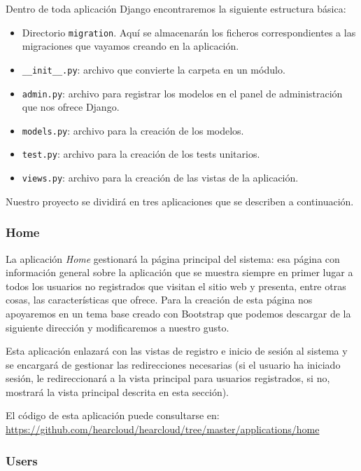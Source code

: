 Dentro de toda aplicación Django encontraremos la siguiente estructura básica:

\begin{itemize}
	\item Directorio \texttt{migration}. Aquí se almacenarán los ficheros correspondientes a las migraciones que vayamos creando en la aplicación.
	\item \texttt{\_\_init\_\_.py}: archivo que convierte la carpeta en un módulo.
	\item \texttt{admin.py}: archivo para registrar los modelos en el panel de administración que nos ofrece Django.
	\item \texttt{models.py}: archivo para la creación de los modelos.
	\item \texttt{test.py}: archivo para la creación de los tests unitarios.
	\item \texttt{views.py}: archivo para la creación de las vistas de la aplicación.
\end{itemize}

Nuestro proyecto se dividirá en tres aplicaciones que se describen a continuación.

\subsubsection{Home}

La aplicación \textit{Home} gestionará la página principal del sistema: esa página con información general sobre la aplicación que se muestra siempre en primer lugar a todos los usuarios no registrados que visitan el sitio web y presenta, entre otras cosas, las características que ofrece. Para la creación de esta página nos apoyaremos en un tema base creado con Bootstrap que podemos descargar de la siguiente dirección \cite{SBA} y modificaremos a nuestro gusto.

Esta aplicación enlazará con las vistas de registro e inicio de sesión al sistema y se encargará de gestionar las redirecciones necesarias (si el usuario ha iniciado sesión, le redireccionará a la vista principal para usuarios registrados, si no, mostrará la vista principal descrita en esta sección).

El código de esta aplicación puede consultarse en: \url{https://github.com/hearcloud/hearcloud/tree/master/applications/home}

\subsubsection{Users}

